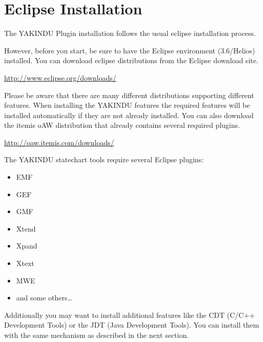 %
\section{Eclipse Installation}

The YAKINDU Plugin installation follows the usual eclipse installation process.

However, before you start, be sure to have the Eclipse environment (3.6/Helios)
installed. You can download eclipse distributions from the Eclipse download site.

\url{http://www.eclipse.org/downloads/}

Please be aware that there are many different distributions supporting different
features. When installing the YAKINDU features the required features will be
installed automatically if they are not already installed. You can also download
the itemis oAW distribution that already contains several required plugins.

\url{http://oaw.itemis.com/downloads/}

The YAKINDU statechart tools require several Eclipse plugins:

\begin{itemize}
\item EMF
\item GEF
\item GMF
\item Xtend
\item Xpand
\item Xtext
\item MWE
\item and some others\dots
\end{itemize}

Additionally you may want to install additional features like the CDT (C/C++
Development Tools) or the JDT (Java Development Tools). You can install them with
the same mechanism as described in the next section.

